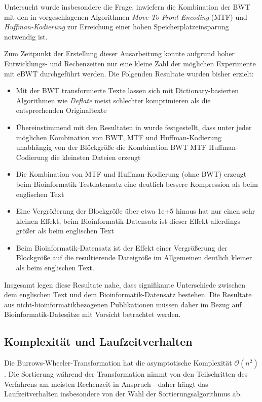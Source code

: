 \documentclass[ngerman,pdftex,paper=A4,DIV=calc,titlepage,12pt]{scrartcl}
\newtheorem[L]{boxedDefinition}{Definition}
\begin{document}
Untersucht wurde insbesondere die Frage, inwiefern die Kombination der BWT mit den in \cite{burrows1994block} vorgeschlagenen Algorithmen \textit{Move-To-Front-Encoding} (MTF) und \textit{Huffman-Kodierung} zur Erreichung einer hohen Speicherplatzeinsparung notwendig ist.

Zum Zeitpunkt der Erstellung dieser Ausarbeitung konnte aufgrund hoher Entwicklungs- und Rechenzeiten nur eine kleine Zahl der möglichen Experimente mit eBWT durchgeführt werden. Die Folgenden Resultate wurden bisher erzielt:
\begin{itemize}
 \item Mit der BWT transformierte Texte lassen sich mit Dictionary-basierten Algorithmen wie \textit{Deflate} meist schlechter komprimieren als die entsprechenden Originaltexte
 \item Übereinstimmend mit den Resultaten in \cite{burrows1994block} wurde festgestellt, dass unter jeder möglichen Kombination von BWT, MTF und Huffman-Kodierung unabhängig von der Blöckgröße die Kombination BWT \textrightarrow MTF \textrightarrow Huffman-Codierung die kleinsten Dateien erzeugt
 \item Die Kombination von MTF und Huffman-Kodierung (ohne BWT) erzeugt beim Bioinformatik-Testdatensatz eine deutlich bessere Kompression als beim englischen Text
 \item Eine Vergrößerung der Blockgröße über etwa 1e+5 hinaus hat nur einen sehr kleinen Effekt, beim Bioinformatik-Datensatz ist dieser Effekt allerdings größer als beim englischen Text
 \item Beim Bioinformatik-Datensatz ist der Effekt einer Vergrößerung der Blockgröße auf die resultierende Dateigröße im Allgemeinen deutlich kleiner als beim englischen Text.
\end{itemize}
Insgesamt legen diese Resultate nahe, dass signifikante Unterschiede zwischen dem englischen Text und dem Bioinformatik-Datensatz bestehen. Die Resultate aus nicht-bioinformatikbezogenen Publikationen müssen daher im Bezug auf Bioinformatik-Datesätze mit Vorsicht betrachtet werden.
\subsection{Komplexität und Laufzeitverhalten}\label{ssec:complexity}
Die Burrows-Wheeler-Transformation hat die asymptotische Komplexität $\mathcal{O}(n^2)$. Die Sortierung während der Transformation nimmt von den Teilschritten des Verfahrens am meisten Rechenzeit in Anspruch - daher hängt das Laufzeitverhalten insbesondere von der Wahl der Sortierungsalgorithmus ab.
\end{document}
